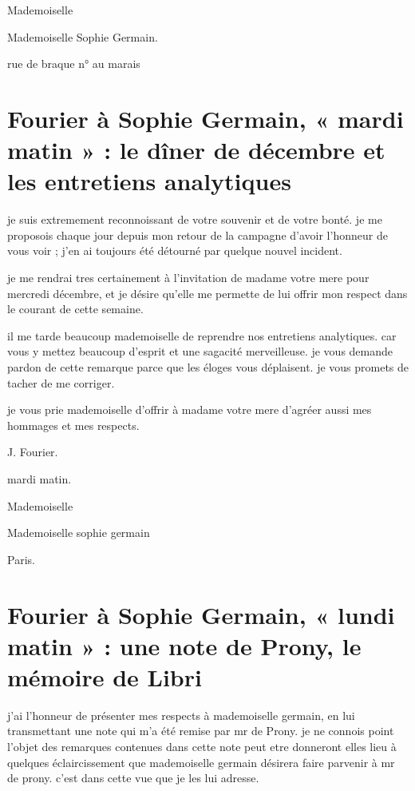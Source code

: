 \documentclass[11pt,a4paper]{article}
\begin{document}
Mademoiselle

Mademoiselle Sophie Germain.

rue de braque n°  au marais

\section{Fourier à Sophie Germain, « mardi matin » : le dîner de décembre et les entretiens analytiques}

je suis extremement reconnoissant de votre souvenir et de votre bonté. je me
proposois chaque jour depuis mon retour de la campagne d'avoir l'honneur de
vous voir ; j'en ai toujours été détourné par quelque nouvel incident.


je me rendrai tres certainement à l'invitation \struck{\ill{}} de madame
votre mere pour mercredi \ill{} décembre, et je désire qu'elle me permette de
lui offrir mon respect dans le courant de cette semaine.


il me tarde beaucoup mademoiselle de reprendre nos entretiens analytiques.
car vous y mettez beaucoup d'esprit et une sagacité merveilleuse. je vous
demande pardon de cette remarque parce que les éloges vous déplaisent. je
vous promets de tacher de me corriger.

je vous prie mademoiselle d'offrir à madame votre mere \struck{\ill{}}
d'agréer aussi \struck{\ill{}} mes hommages et mes respects.

J. Fourier.

mardi matin.

Mademoiselle

Mademoiselle sophie germain

Paris.

\section{Fourier à Sophie Germain, « lundi matin » : une note de Prony, le mémoire de Libri}

j'ai l'honneur de présenter mes respects à mademoiselle germain, en lui
transmettant une note qui m'a été remise par mr de Prony. je ne connois point
l'objet des remarques contenues dans cette note peut etre donneront elles
lieu à quelques éclaircissement que mademoiselle germain désirera faire
parvenir à mr de prony. c'est dans cette vue que je les lui adresse.
\end{document}
